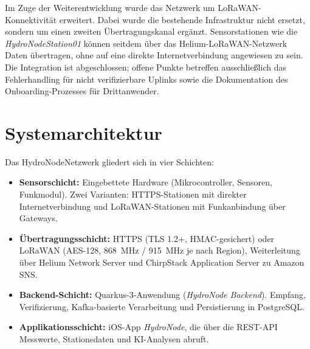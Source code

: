 Im Zuge der Weiterentwicklung wurde das Netzwerk um LoRaWAN-Konnektivität erweitert.
Dabei wurde die bestehende Infrastruktur nicht ersetzt, sondern um einen zweiten
Übertragungskanal ergänzt.
Sensorstationen wie die \textit{HydroNodeStation01} können seitdem über das
Helium-LoRaWAN-Netzwerk Daten übertragen, ohne auf eine direkte Internetverbindung
angewiesen zu sein.
Die Integration ist abgeschlossen; offene Punkte betreffen ausschließlich das Fehlerhandling
für nicht verifizierbare Uplinks sowie die Dokumentation des Onboarding-Prozesses für
Drittanwender.

\newpage
\section*{Systemarchitektur}

Das HydroNodeNetzwerk gliedert sich in vier Schichten:

\begin{itemize}
  \item \textbf{Sensorschicht:} Eingebettete Hardware (Mikrocontroller, Sensoren, Funkmodul).
        Zwei Varianten: HTTPS-Stationen mit direkter Internetverbindung und LoRaWAN-Stationen
        mit Funkanbindung über Gateways.
  \item \textbf{Übertragungsschicht:} HTTPS (TLS 1.2+, HMAC-gesichert) oder LoRaWAN
        (AES-128, 868~MHz / 915~MHz je nach Region), Weiterleitung über Helium Network Server
        und ChirpStack Application Server zu Amazon SNS.
  \item \textbf{Backend-Schicht:} Quarkus-3-Anwendung (\textit{HydroNode Backend}).
        Empfang, Verifizierung, Kafka-basierte Verarbeitung und Persistierung in PostgreSQL.
  \item \textbf{Applikationsschicht:} iOS-App \textit{HydroNode}, die über die REST-API
        Messwerte, Stationsdaten und KI-Analysen abruft.
\end{itemize}

